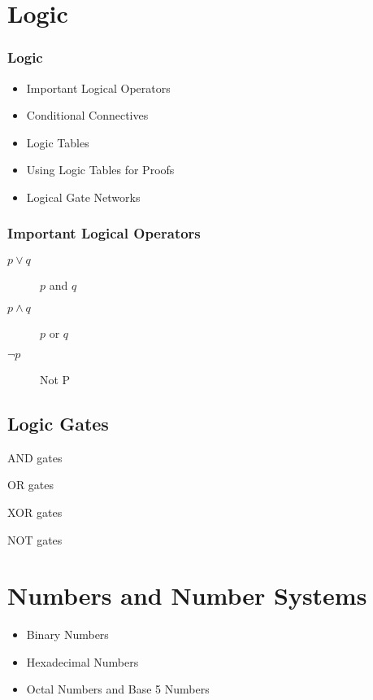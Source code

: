 \section{Logic}

\begin{frame}
\frametitle{Logic}
\begin{itemize}
\item Important Logical Operators
\item Conditional Connectives
\item Logic Tables
\item Using Logic Tables for Proofs
\item Logical Gate Networks
\end{itemize}
\end{frame}

\begin{frame}
\frametitle{Important Logical Operators}

\begin{description}
\item[$p \vee q$] $p$ and $q$
\item[$p \wedge q$] $p$ or $q$
\item[$\neg p$] Not P
\end{description}
\end{frame}
\subsection*{Logic Gates}

\begin{description}
\item AND gates
\item OR gates
\item XOR gates
\item NOT gates
\end{description}
\newpage
\section{Numbers and Number Systems}
\begin{itemize}
\item Binary Numbers
\item Hexadecimal Numbers
\item Octal Numbers and Base 5 Numbers
\end{itemize}

